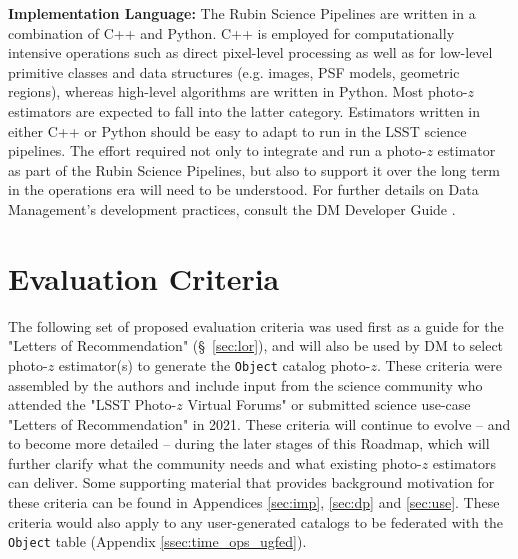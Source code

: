 \documentclass[DM,authoryear,toc]{lsstdoc}
\begin{document}
\textbf{Implementation Language:}
The Rubin Science Pipelines are written in a combination of C++ and Python. 
C++ is employed for computationally intensive operations such as direct pixel-level processing as well as for low-level primitive classes and data structures (e.g. images, PSF models, geometric regions), whereas high-level algorithms are written in Python. 
Most photo-$z$ estimators are expected to fall into the latter category.
Estimators written in either C++ or Python should be easy to adapt to run in the LSST science pipelines. 
The effort required not only to integrate and run a photo-$z$ estimator as part of the Rubin Science Pipelines, but also to support it over the long term in the operations era will need to be understood. 
For further details on Data Management's development practices, consult the DM Developer Guide \cite{DevGuide}.


\section{Evaluation Criteria} \label{sec:eval}

The following set of proposed evaluation criteria was used first as a guide for the "Letters of Recommendation" (\S~\ref{sec:lor}), and will also be used by DM to select photo-$z$ estimator(s) to generate the {\tt Object} catalog photo-$z$.
These criteria were assembled by the authors and include input from the science community who attended the "LSST Photo-$z$ Virtual Forums" or submitted science use-case "Letters of Recommendation" in 2021.
These criteria will continue to evolve -- and to become more detailed -- during the later stages of this Roadmap, which will further clarify what the community needs and what existing photo-$z$ estimators can deliver.
Some supporting material that provides background motivation for these criteria can be found in Appendices \ref{sec:imp}, \ref{sec:dp} and \ref{sec:use}.
These criteria would also apply to any user-generated catalogs to be federated with the {\tt Object} table (Appendix \ref{ssec:time_ops_ugfed}).
\end{document}
